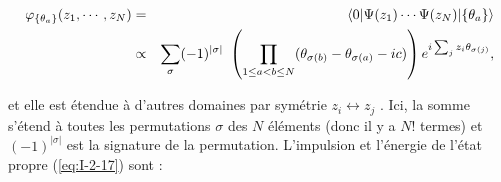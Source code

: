 \begin{eqnarray}
	\varphi_{\{\theta_a\}} ( z_1 , \cdots , z_N ) & = & \langle 0 \vert \Psi ( z_1 ) \cdots \Psi (z_N ) \vert \{ \theta_a \} \rangle \notag\\
	& \propto & \sum_\sigma ( - 1 ) ^{ \vert \sigma \vert } \left ( \prod_{ 1 \leq a < b \leq N } ( \theta_{\sigma(b)} - \theta_{\sigma(a)} - ic ) \right ) e^{i \sum_j z_i \theta_{ \sigma(j)}}\label{eq:I-2-17},
\end{eqnarray}

et elle est étendue à d'autres domaines par symétrie $z_i \leftrightarrow z_j$ . Ici, la somme s'étend à toutes les permutations $\sigma$ des $N$ éléments (donc il y a $N!$ termes) et $(-1)^{|\sigma|}$ est la signature de la permutation. L'impulsion et l'énergie de l'état propre (\ref{eq:I-2-17}) sont :







